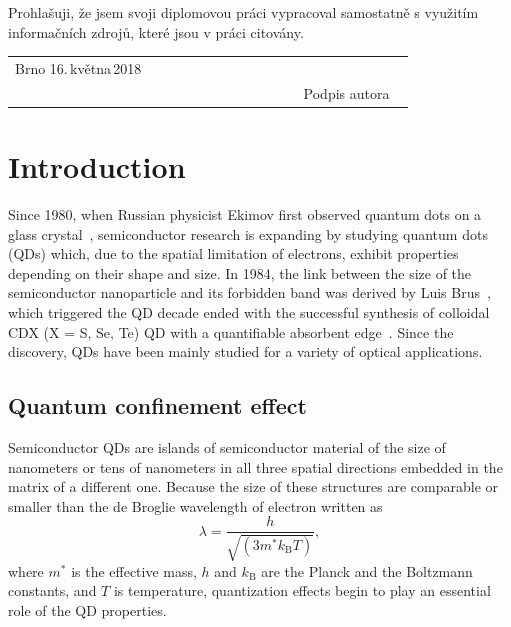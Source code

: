 \documentclass[
a4paper, %
11pt, %
onecolumn, %
openany, %
oldfontcommands,
]{memoir}
\begin{document}
\noindent Prohlašuji, že jsem svoji diplomovou práci vypracoval samostatně
s využitím informačních zdrojů, které jsou v práci citovány.
\vspace{1cm}
\begin{center}
	\centering
	\begin{tabular}{p{0.5\linewidth}p{0.15\linewidth}p{0.25\linewidth}}
		Brno 16.\,května\,2018 &  & \\\cmidrule[0.5pt]{3-3}
		&&\centering Podpis autora \\ 
	\end{tabular}
\end{center}

\newpage



\pagestyle{standard}

\tableofcontents*


\clearpage




\chapter{Introduction}\label{chap:introduction}

Since 1980, when Russian physicist Ekimov first observed quantum dots on a glass crystal~\cite{Ekimov}, semiconductor research is expanding by studying quantum dots (QDs) which, due to the spatial limitation of electrons, exhibit properties depending on their shape and size. In 1984, the link between the size of the semiconductor nanoparticle and its forbidden band was derived by Luis Brus~\cite{Brus}, which triggered the QD decade ended with the successful synthesis of colloidal CDX (X = S, Se, Te) QD with a quantifiable absorbent edge~\cite{Murray}. Since the discovery, QDs have been mainly studied for a variety of optical applications. %

\section{Quantum confinement effect}
Semiconductor QDs are islands of semiconductor material of the size of nanometers or tens of nanometers in all three spatial directions embedded in the matrix of a different one. Because the size of these structures are comparable or smaller than the de Broglie wavelength of electron written as
\begin{equation}
\lambda=\frac{h}{\sqrt{(3m^*k_\mathrm{B}T)}},
\end{equation}
where $m^*$ is the effective mass, $h$ and $k_\mathrm{B}$ are the Planck and the Boltzmann constants, and $T$ is temperature, quantization effects begin to play an essential role of the QD properties. 
\end{document}
